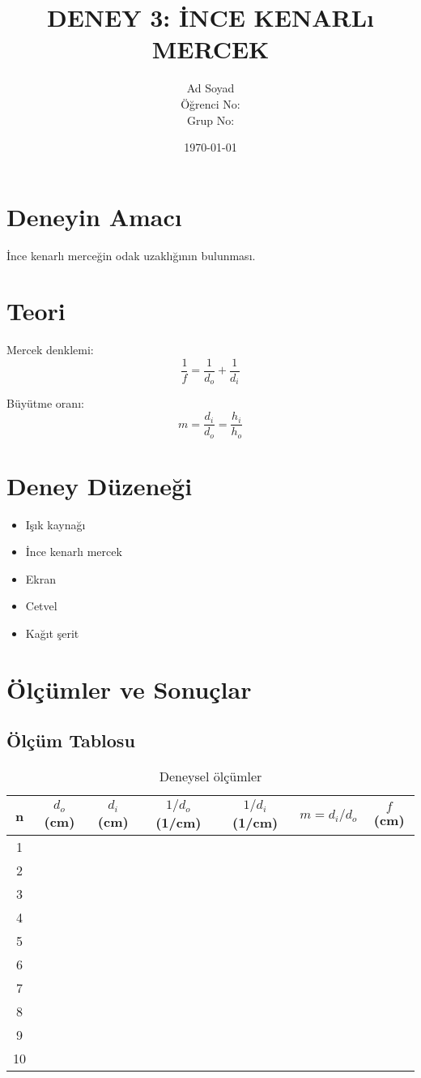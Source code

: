 \documentclass[12pt,a4paper]{article}
\title{DENEY 3: İNCE KENARLı MERCEK}
\author{Ad Soyad \\ Öğrenci No: \\ Grup No: }
\date{\today}
\begin{document}
\maketitle

\section{Deneyin Amacı}
İnce kenarlı merceğin odak uzaklığının bulunması.

\section{Teori}
Mercek denklemi:
\begin{equation}
\frac{1}{f} = \frac{1}{d_o} + \frac{1}{d_i}
\end{equation}

Büyütme oranı:
\begin{equation}
m = \frac{d_i}{d_o} = \frac{h_i}{h_o}
\end{equation}

\section{Deney Düzeneği}
\begin{itemize}
    \item Işık kaynağı
    \item İnce kenarlı mercek
    \item Ekran
    \item Cetvel
    \item Kağıt şerit
\end{itemize}

\section{Ölçümler ve Sonuçlar}

\subsection{Ölçüm Tablosu}
\begin{table}[H]
\centering
\small
\begin{tabular}{|c|c|c|c|c|c|c|}
\hline
n & $d_o$ (cm) & $d_i$ (cm) & $1/d_o$ (1/cm) & $1/d_i$ (1/cm) & $m = d_i/d_o$ & $f$ (cm) \\
\hline
1 & & & & & & \\
2 & & & & & & \\
3 & & & & & & \\
4 & & & & & & \\
5 & & & & & & \\
6 & & & & & & \\
7 & & & & & & \\
8 & & & & & & \\
9 & & & & & & \\
10 & & & & & & \\
\hline
\end{tabular}
\caption{Deneysel ölçümler}
\end{table}
\end{document}
